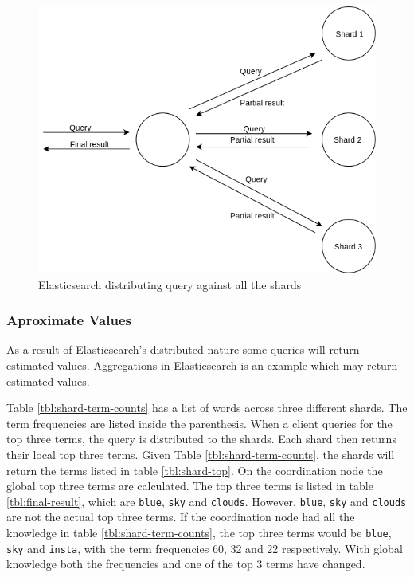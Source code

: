 \begin{figure}[h]
  \centering
  \includegraphics[width=0.9\linewidth]{img/elasticsearch-sharding.png}
  \caption{Elasticsearch distributing query against all the shards}
  \label{fig:elasticsearch-sharding}
\end{figure}

\subsubsection{Aproximate Values}
As a result of Elasticsearch's distributed nature some queries will return estimated values.
Aggregations in Elasticsearch is an example which may return estimated values.

Table \ref{tbl:shard-term-counts} has a list of words across three different shards.
The term frequencies are listed inside the parenthesis.
When a client queries for the top three terms, the query is distributed to the shards.
Each shard then returns their local top three terms.
Given Table \ref{tbl:shard-term-counts},
the shards will return the terms listed in table \ref{tbl:shard-top}.
On the coordination node the global top three terms are calculated.
The top three terms is listed in table \ref{tbl:final-result}, which are \texttt{blue}, \texttt{sky} and \texttt{clouds}.
However, \texttt{blue}, \texttt{sky} and \texttt{clouds} are not the actual top three terms.
If the coordination node had all the knowledge in table \ref{tbl:shard-term-counts},
the top three terms would be \texttt{blue}, \texttt{sky} and \texttt{insta},
with the term frequencies 60, 32 and 22 respectively.
With global knowledge both the frequencies and one of the top 3 terms have changed.

